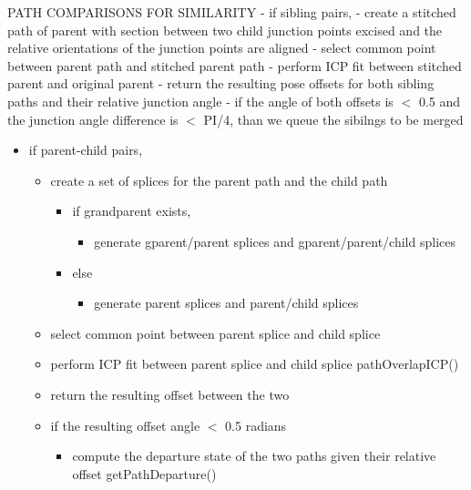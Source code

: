 PATH COMPARISONS FOR SIMILARITY
- if sibling pairs,
 - create a stitched path of parent with section between two child junction points excised and the relative orientations of the junction points are aligned
 - select common point between parent path and stitched parent path
 - perform ICP fit between stitched parent and original parent
 - return the resulting pose offsets for both sibling paths and their relative junction angle
 - if the angle of both offsets is $<$ 0.5 and the junction angle difference is $<$ PI\slash 4, than we queue the sibilngs to be merged

\begin{itemize}
\item if parent-child pairs,

\begin{itemize}
\item create a set of splices for the parent path and the child path

\begin{itemize}
\item if grandparent exists,

\begin{itemize}
\item generate gparent\slash parent splices and gparent\slash parent\slash child splices

\end{itemize}

\item else

\begin{itemize}
\item generate parent splices and parent\slash child splices

\end{itemize}

\end{itemize}

\item select common point between parent splice and child splice

\item perform ICP fit between parent splice and child splice pathOverlapICP()

\item return the resulting offset between the two

\item if the resulting offset angle $<$ 0.5 radians

\begin{itemize}
\item compute the departure state of the two paths given their relative offset getPathDeparture()


\end{itemize}
\end{itemize}
\end{itemize}

